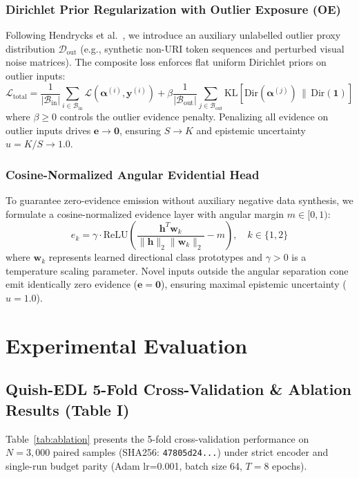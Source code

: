 \documentclass[conference]{IEEEtran}
\begin{document}
\subsubsection{Dirichlet Prior Regularization with Outlier Exposure (OE)}
Following Hendrycks et al.~\cite{hendrycks2019}, we introduce an auxiliary unlabelled outlier proxy distribution $\mathcal{D}_{\text{out}}$ (e.g., synthetic non-URI token sequences and perturbed visual noise matrices). The composite loss enforces flat uniform Dirichlet priors on outlier inputs:
\begin{equation}
\mathcal{L}_{\text{total}} = \frac{1}{|\mathcal{B}_{\text{in}}|} \sum_{i \in \mathcal{B}_{\text{in}}} \mathcal{L}(\boldsymbol{\alpha}^{(i)}, \mathbf{y}^{(i)}) + \beta \frac{1}{|\mathcal{B}_{\text{out}}|} \sum_{j \in \mathcal{B}_{\text{out}}} \text{KL}\left[\text{Dir}(\boldsymbol{\alpha}^{(j)}) \,\|\, \text{Dir}(\mathbf{1})\right]
\end{equation}
where $\beta \ge 0$ controls the outlier evidence penalty. Penalizing all evidence on outlier inputs drives $\mathbf{e} \to \mathbf{0}$, ensuring $S \to K$ and epistemic uncertainty $u = K/S \to 1.0$.

\subsubsection{Cosine-Normalized Angular Evidential Head}
To guarantee zero-evidence emission without auxiliary negative data synthesis, we formulate a cosine-normalized evidence layer with angular margin $m \in [0, 1)$:
\begin{equation}
e_k = \gamma \cdot \text{ReLU}\left(\frac{\mathbf{h}^T \mathbf{w}_k}{\|\mathbf{h}\|_2 \|\mathbf{w}_k\|_2} - m\right), \quad k \in \{1, 2\}
\end{equation}
where $\mathbf{w}_k$ represents learned directional class prototypes and $\gamma > 0$ is a temperature scaling parameter. Novel inputs outside the angular separation cone emit identically zero evidence ($\mathbf{e} = \mathbf{0}$), ensuring maximal epistemic uncertainty ($u = 1.0$).

\section{Experimental Evaluation}

\subsection{Quish-EDL 5-Fold Cross-Validation \& Ablation Results (Table I)}
Table~\ref{tab:ablation} presents the 5-fold cross-validation performance on $N=3,000$ paired samples (SHA256: \texttt{47805d24...}) under strict encoder and single-run budget parity (Adam lr=0.001, batch size 64, $T=8$ epochs).
\end{document}
